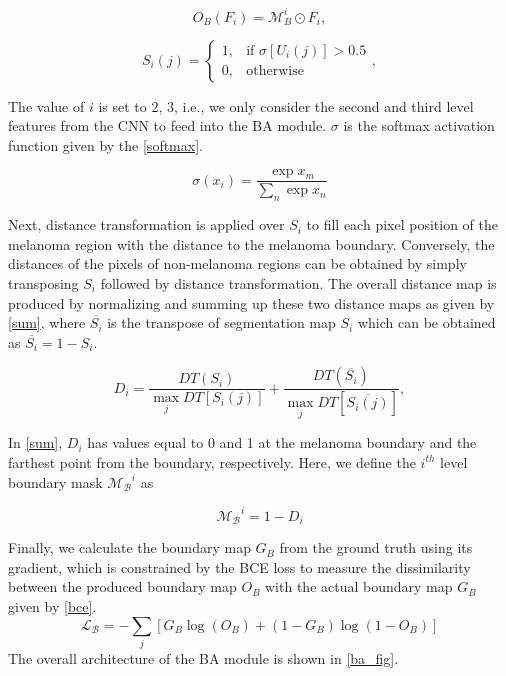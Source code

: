 \documentclass[review]{elsarticle}
\begin{document}
\begin{equation}\label{ba}
    O_B(F_i)=\mathcal{M}_B^i\odot F_i,
\end{equation}

\begin{equation}\label{binary}
    S_i(j)=\begin{cases}
    1, & \text{if }\sigma [U_i(j)]>0.5\\
    0, & \text{otherwise}
    \end{cases},
\end{equation}

The value of $i$ is set to 2, 3, i.e., we only consider the second and third level features from the CNN to feed into the BA module. $\sigma$ is the softmax activation function given by the \autoref{softmax}.

\begin{equation}\label{softmax}
    \sigma(x_i)=\frac{\exp x_m}{\sum\limits_{n}\exp x_n}
\end{equation}

Next, distance transformation \cite{fabbri20082d} is applied over $S_i$ to fill each pixel position of the melanoma region with the distance to the melanoma boundary. Conversely, the distances of the pixels of non-melanoma regions can be obtained by simply transposing $S_i$ followed by distance transformation. The overall distance map is produced by normalizing and summing up these two distance maps as given by \autoref{sum}, where $\overline{S_i}$ is the transpose of segmentation map $S_i$ which can be obtained as $\overline{S_i}=1-S_i$.

\begin{equation}\label{sum}
    D_i=\frac{DT(S_i)}{\max_j DT[S_i(j)]}+\frac{DT(\overline{S_i})}{\max_j DT[\overline{S_i(j)}]},
\end{equation}

 In \autoref{sum}, $D_i$ has values equal to 0 and 1 at the melanoma boundary and the farthest point from the boundary, respectively. Here, we define the $i^{th}$ level boundary mask $\mathcal{M_B}^i$ as

\begin{equation}
    \mathcal{M_B}^i=1-D_i
\end{equation}

Finally, we calculate the boundary map $G_B$ from the ground truth using its gradient, which is constrained by the BCE loss to measure the dissimilarity between the produced boundary map $O_B$ with the actual boundary map $G_B$ given by \autoref{bce}.
\begin{equation}\label{bce}
    \mathcal{L_B}=-\sum\limits_{j}[G_B\log(O_B)+(1-G_B)\log(1-O_B)]
\end{equation}
The overall architecture of the BA module is shown in \autoref{ba_fig}.
\end{document}
